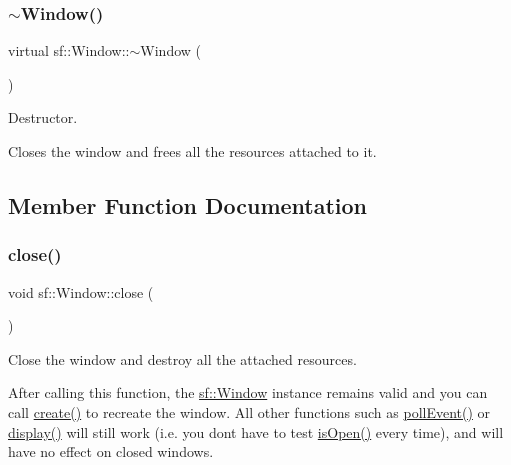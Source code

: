 \subsubsection{\texorpdfstring{$\sim$Window()}{~Window()}}
{\footnotesize\ttfamily virtual sf\+::\+Window\+::$\sim$\+Window (\begin{DoxyParamCaption}{ }\end{DoxyParamCaption})\hspace{0.3cm}{\ttfamily [virtual]}}



Destructor. 

Closes the window and frees all the resources attached to it. \begin{DoxyVerb}\end{DoxyVerb}
 

\subsection{Member Function Documentation}
\mbox{\label{classsf_1_1_window_a99d1e030387b0c26f5995670504fe7b5}} 
\subsubsection{\texorpdfstring{close()}{close()}}
{\footnotesize\ttfamily void sf\+::\+Window\+::close (\begin{DoxyParamCaption}{ }\end{DoxyParamCaption})}



Close the window and destroy all the attached resources. 

After calling this function, the \mbox{\hyperlink{classsf_1_1_window}{sf\+::\+Window}} instance remains valid and you can call \mbox{\hyperlink{classsf_1_1_window_a30e6edf2162f8dbff61023b9de5d961d}{create()}} to recreate the window. All other functions such as \mbox{\hyperlink{classsf_1_1_window_a338e996585faf82e93069858e3b531b7}{poll\+Event()}} or \mbox{\hyperlink{classsf_1_1_window_adabf839cb103ac96cfc82f781638772a}{display()}} will still work (i.\+e. you don\textquotesingle{}t have to test \mbox{\hyperlink{classsf_1_1_window_ae873503db7d48157bb9cbf6129562bce}{is\+Open()}} every time), and will have no effect on closed windows. \begin{DoxyVerb}\end{DoxyVerb}
 \mbox{\label{classsf_1_1_window_a30e6edf2162f8dbff61023b9de5d961d}} 
